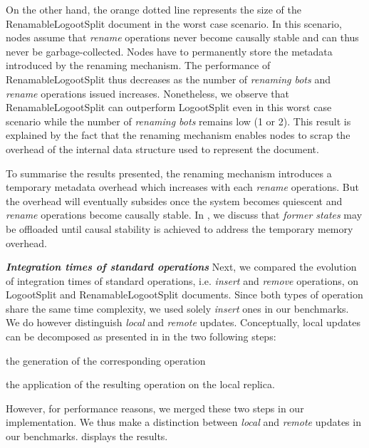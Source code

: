 \documentclass[10pt,journal,compsoc]{IEEEtran}
\newcommand{\ie}{i.e. }
\newcommand{\headerparagraph}[1]{\textbf{\emph{#1}}\quad}
\begin{document}
On the other hand, the orange dotted line represents the size of the RenamableLogootSplit document in the worst case scenario.
In this scenario, nodes assume that \emph{rename} operations never become causally stable and can thus never be garbage-collected.
Nodes have to permanently store the metadata introduced by the renaming mechanism.
The performance of RenamableLogootSplit thus decreases as the number of \emph{renaming bots} and \emph{rename} operations issued increases.
Nonetheless, we observe that RenamableLogootSplit can outperform LogootSplit even in this worst case scenario while the number of \emph{renaming bots} remains low (1 or 2).
This result is explained by the fact that the renaming mechanism enables nodes to scrap the overhead of the internal data structure used to represent the document.

To summarise the results presented, the renaming mechanism introduces a temporary metadata overhead which increases with each \emph{rename} operations.
But the overhead will eventually subsides once the system becomes quiescent and \emph{rename} operations become causally stable.
In , we discuss that \emph{former states} may be offloaded until causal stability is achieved to address the temporary memory overhead.

\headerparagraph{Integration times of standard operations}
%
Next, we compared the evolution of integration times of standard operations, \ie \emph{insert} and \emph{remove} operations, on LogootSplit and RenamableLogootSplit documents.
Since both types of operation share the same time complexity, we used solely \emph{insert} ones in our benchmarks.
We do however distinguish \emph{local} and \emph{remote} updates.
Conceptually, local updates can be decomposed as presented in \cite{baquero2017pure} in the two following steps:
\begin{enumerate*}[label=(\roman*)]
    \item the generation of the corresponding operation
    \item the application of the resulting operation on the local replica.
\end{enumerate*}
However, for performance reasons, we merged these two steps in our implementation.
We thus make a distinction between \emph{local} and \emph{remote} updates in our benchmarks.
 displays the results.
\end{document}
